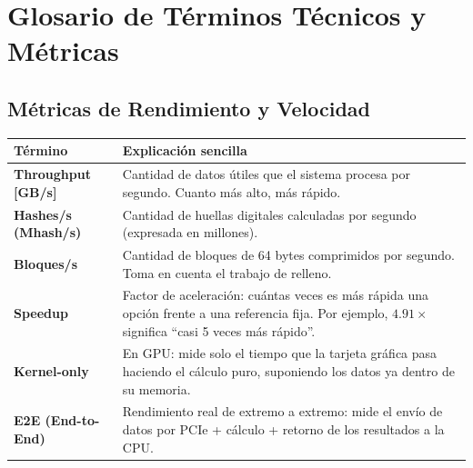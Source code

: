 \documentclass[11pt,a4paper]{article}
\begin{document}
\section{Glosario de Términos Técnicos y Métricas}

\subsection{Métricas de Rendimiento y Velocidad}
\noindent\begin{tabularx}{\linewidth}{@{}p{3.8cm} X@{}}
\toprule
\textbf{Término} & \textbf{Explicación sencilla} \\
\midrule
\textbf{Throughput [GB/s]} & Cantidad de datos útiles que el sistema procesa por segundo. Cuanto más alto, más rápido. \\
\addlinespace
\textbf{Hashes/s (Mhash/s)} & Cantidad de huellas digitales calculadas por segundo (expresada en millones). \\
\addlinespace
\textbf{Bloques/s} & Cantidad de bloques de 64 bytes comprimidos por segundo. Toma en cuenta el trabajo de relleno. \\
\addlinespace
\textbf{Speedup} & Factor de aceleración: cuántas veces es más rápida una opción frente a una referencia fija. Por ejemplo, $4.91\times$ significa ``casi 5 veces más rápido''. \\
\addlinespace
\textbf{Kernel-only} & En GPU: mide solo el tiempo que la tarjeta gráfica pasa haciendo el cálculo puro, suponiendo los datos ya dentro de su memoria. \\
\addlinespace
\textbf{E2E (End-to-End)} & Rendimiento real de extremo a extremo: mide el envío de datos por PCIe + cálculo + retorno de los resultados a la CPU. \\
\bottomrule
\end{tabularx}

\vspace{1.2em}
\end{document}
